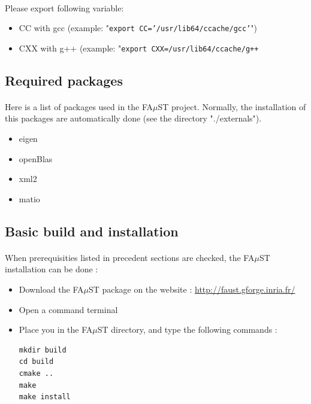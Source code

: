 \paragraph{}Please export following variable:
\begin{itemize}
\item CC with gcc (example: "\texttt{export CC='/usr/lib64/ccache/gcc'}") 
\item CXX with g++ (example: "\texttt{export CXX=/usr/lib64/ccache/g++}
\end{itemize}

\subsection{Required packages}\label{sec:RequiredPackages}

\paragraph{}Here is a list of packages used in the FA$\mu$ST project. Normally, the installation of this packages are automatically done (see the directory "./externals").
\begin{itemize}
\item eigen
\item openBlas
\item xml2
\item matio
\end{itemize}

\subsection{Basic build and installation}\label{sec:UnixBuildInstall}
\paragraph{}When prerequisities listed in precedent sections are checked, the FA$\mu$ST installation can be done : 

\begin{itemize}
\item Download the FA$\mu$ST package on the website :  \url{http://faust.gforge.inria.fr/}
\item Open a command terminal
\item Place you in the FA$\mu$ST directory, and type the following commands : 
\begin{lstlisting}
mkdir build
cd build
cmake ..
make
make install
\end{lstlisting}
\end{itemize}


